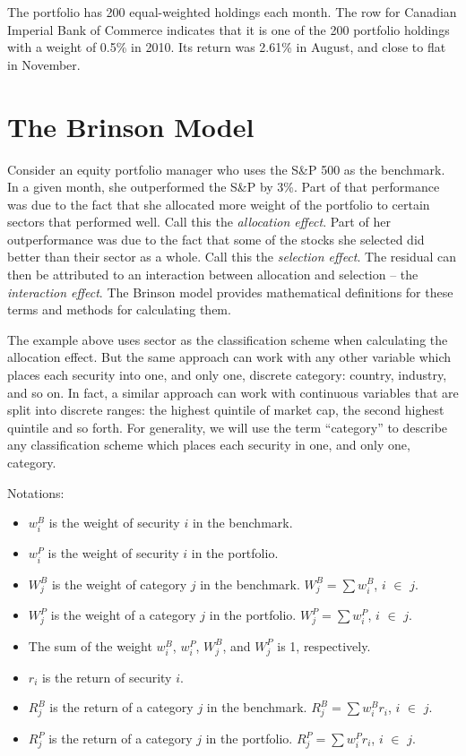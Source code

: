 The portfolio has 200 equal-weighted holdings each month. The row 
for Canadian Imperial Bank of Commerce indicates that it is one of the 200
portfolio holdings with a weight of 0.5\% in 2010. Its return was
2.61\% in August, and close to flat in November.

\section{The Brinson Model}

Consider an equity portfolio manager who uses the S\&P 500 as the
benchmark. In a given month, she outperformed the S\&P by 3\%. Part of
that performance was due to the fact that she allocated more weight of
the portfolio to certain sectors that performed well. Call this the
\emph{allocation effect}. Part of her outperformance was due to the
fact that some of the stocks she selected did better than their sector
as a whole. Call this the \emph{selection effect}. The residual can
then be attributed to an interaction between allocation and selection
-- the \emph{interaction effect}. The Brinson model provides
mathematical definitions for these terms and methods for calculating
them.

The example above uses sector as the classification scheme when
calculating the allocation effect. But the same approach can work with
any other variable which places each security into one, and only one,
discrete category: country, industry, and so on. In fact, a similar
approach can work with continuous variables that are split into
discrete ranges: the highest quintile of market cap, the second
highest quintile and so forth. For generality, we will use the term
``category'' to describe any classification scheme which places each
security in one, and only one, category.

Notations:


\begin{itemize}

\item $w^B_i$ is the weight of security $i$ in the benchmark.
\item $w^P_i$ is the weight of security $i$ in the portfolio.
\item $W^B_j$ is the weight of category $j$ in the benchmark. $W^B_j
  = \sum w^B_i$, $i$ $\in$ $j$.
\item $W^P_j$ is the weight of a category $j$ in the portfolio. $W^P_j
  = \sum w^P_i$, $i$ $\in$ $j$.
\item The sum of the weight $w^B_i$, $w^P_i$, $W^B_j$, and $W^P_j$ is 1, respectively.
  \item $r_i$ is the return of security $i$.
\item $R^B_j$ is the return of a category $j$ in the benchmark. $R^B_j
  = \sum w^B_ir_i$, $i$ $\in$ $j$.
\item $R^P_j$ is the return of a category $j$ in the portfolio. $R^P_j
  = \sum w^P_ir_i$, $i$ $\in$ $j$.
\end{itemize}

